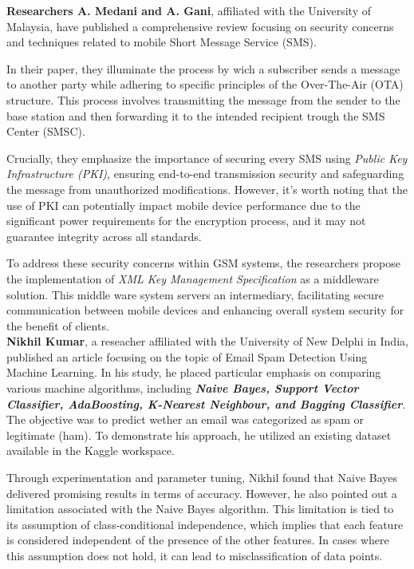 \documentclass[12pt,a4paper]{report}
\begin{document}
	\cite{medani2011review} \textbf{Researchers A. Medani and A. Gani}, affiliated with the University of Malaysia, have published a comprehensive review focusing on security concerns and techniques related to mobile Short Message Service (SMS).
	
	In their paper, they illuminate the process by wich a subscriber sends a message to another party while adhering to specific principles of the Over-The-Air (OTA) structure. This process involves transmitting the message from the sender to the base station and then forwarding it to the intended recipient trough the SMS Center (SMSC).
	
	Crucially, they emphasize the importance of securing every SMS using \textit{Public Key Infrastructure (PKI)}, ensuring end-to-end transmission security and safeguarding the message from unauthorized modifications. However, it's worth noting that the use of PKI can potentially impact mobile device performance due to the significant power requirements for the encryption process, and it may not guarantee integrity across all standards.
	
	To address these security concerns within GSM systems, the researchers propose the implementation of \textit{XML Key Management Specification} as a middleware solution. This middle ware system servers an intermediary, facilitating secure communication between mobile devices and enhancing overall system security for the benefit of clients.\\
	
	
	\cite{crawford2015survey} \textbf{Nikhil Kumar}, a reseacher affiliated with the University of New Delphi in India, published an article focusing on the topic of Email Spam Detection Using Machine Learning. In his study, he placed particular emphasis on comparing various machine algorithms, including \textbf{\textit{Naive Bayes, Support Vector Classifier, AdaBoosting, K-Nearest Neighbour, and Bagging Classifier}}. The objective was to predict wether an email was categorized as spam or legitimate (ham). To demonstrate his approach, he utilized an existing dataset available in the Kaggle workspace.
	
	Through experimentation and parameter tuning, Nikhil found that Naive Bayes delivered promising results in terms of accuracy. However, he also pointed out a limitation associated with the Naive Bayes algorithm. This limitation is tied to its assumption of class-conditional independence, which implies that each feature is considered independent of the presence of the other features. In cases where this assumption does not hold, it can lead to misclassification of data points.
	
\end{document}
